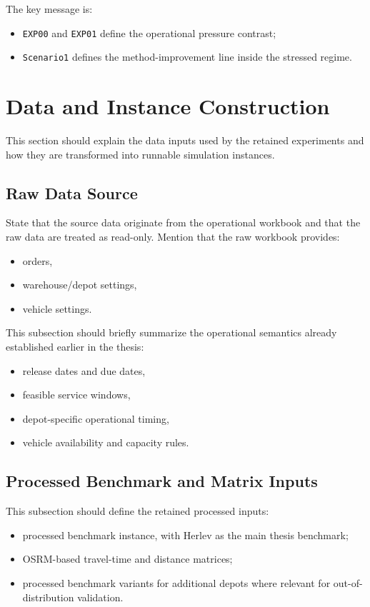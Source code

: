 \noindent The key message is:
\begin{itemize}
    \item \texttt{EXP00} and \texttt{EXP01} define the operational pressure contrast;
    \item \texttt{Scenario1} defines the method-improvement line inside the stressed regime.
\end{itemize}

\section{Data and Instance Construction}

This section should explain the data inputs used by the retained experiments and how they are transformed into runnable simulation instances.

\subsection{Raw Data Source}

State that the source data originate from the operational workbook and that the raw data are treated as read-only. Mention that the raw workbook provides:
\begin{itemize}
    \item orders,
    \item warehouse/depot settings,
    \item vehicle settings.
\end{itemize}

This subsection should briefly summarize the operational semantics already established earlier in the thesis:
\begin{itemize}
    \item release dates and due dates,
    \item feasible service windows,
    \item depot-specific operational timing,
    \item vehicle availability and capacity rules.
\end{itemize}

\subsection{Processed Benchmark and Matrix Inputs}

This subsection should define the retained processed inputs:
\begin{itemize}
    \item processed benchmark instance, with Herlev as the main thesis benchmark;
    \item OSRM-based travel-time and distance matrices;
    \item processed benchmark variants for additional depots where relevant for out-of-distribution validation.
\end{itemize}

